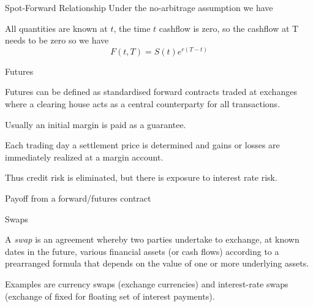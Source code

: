 
{Spot-Forward Relationship}
Under the no-arbitrage assumption we have

\begin{center}
\end{center}

All quantities are known at $t$, the time $t$ cashflow is zero, so the cashflow at T needs to be zero so we have $$F(t,T) = S(t)e^{r(T-t)}$$

{Futures}


	Futures can be defined as standardised forward contracts traded at exchanges where a clearing house acts as a central counterparty for all transactions.

	Usually an initial margin is paid as a guarantee.

	Each trading day a settlement price is determined and gains or losses are immediately realized at a margin account.

	Thus credit risk is eliminated, but there is exposure to interest rate risk.


{Payoff from a forward/futures contract}
\begin{figure}
  \centering
   \qquad
\end{figure}

{Swaps}


	A {\it swap} is an agreement whereby two parties
undertake to exchange, at known dates in the future, various
financial assets (or cash flows) according to a prearranged
formula that depends on the value of one or more underlying
assets.

	Examples are currency swaps (exchange currencies) and
interest-rate swaps (exchange of fixed for floating set of
interest payments).

